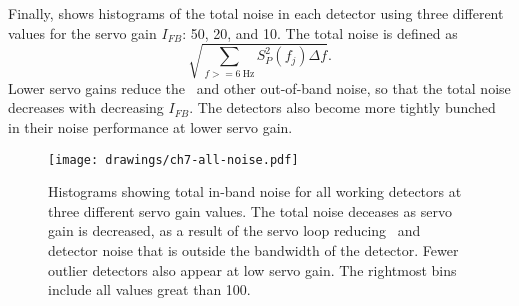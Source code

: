 Finally,  shows histograms of the total noise in each detector using three different values for the servo gain $I_{FB}$: 50, 20, and 10.
The total noise is defined as
\begin{equation} \label{eqn:ch7-tot-noise-defn}
  \sqrt{ \sum_{f >= \SI{6}{\hertz}} S^2_P(f_j) \Delta f}.
\end{equation}
Lower servo gains reduce the \SQUID\ and other out-of-band noise, so that the total noise decreases with decreasing $I_{FB}$.
The detectors also become more tightly bunched in their noise performance at lower servo gain.

\begin{figure*}
  \centering
\texttt{[image: drawings/ch7-all-noise.pdf]}
\caption{
Histograms showing total in-band noise for all working detectors at three different servo gain values.
The total noise deceases as servo gain is decreased, as a result of the servo loop reducing \SQUID\ and detector noise that is outside the bandwidth of the detector.
Fewer outlier detectors also appear at low servo gain.
The rightmost bins include all values great than \SI{100}{\fW}.}
\label{fig:ch7-all-noise}
\end{figure*}
